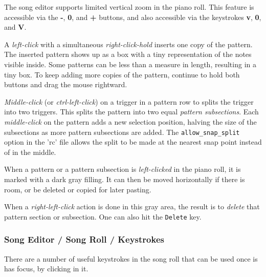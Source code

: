    The song editor supports limited vertical zoom in the piano roll.
   This feature is accessible via the \textbf{-}, \textbf{0}, and
   \textbf{+} buttons, and also
   accessible via the keystrokes \textbf{v}, \textbf{0}, and \textbf{V}.

   A \textsl{left-click} with a simultaneous
   \textsl{right-click-hold} inserts one copy of the
   pattern.  The inserted pattern shows up as a box with a tiny
   representation of the notes visible inside.  Some patterns can
   be less than a measure in length, resulting in a tiny box.
   To keep adding more copies of the pattern, continue to hold both buttons
   and drag the mouse rightward.

   \textsl{Middle-click} (or \textsl{ctrl-left-click})
   on a trigger in a pattern row
   to splits the trigger into two triggers.
   This splits the pattern into two equal \textsl{pattern subsections}.
   Each \textsl{middle-click} on the pattern adds a new selection position,
   halving the size of the subsections as more pattern subsections are
   added.  The \texttt{allow\_snap\_split} option in the 'rc' file
   allows the split to be made at the nearest snap point instead of in the
   middle.

   When a pattern or a pattern subsection is
   \textsl{left-clicked} in the piano
   roll, it is marked with a dark gray filling.
   It can then be moved horizontally if there is room, or be deleted or copied
   for later pasting.

   When a 
   \textsl{right-left-click} action is done in this gray area, the result
   is to \textsl{delete} that pattern section or subsection.
   One can also hit the \texttt{Delete} key.

\subsubsection{Song Editor / Song Roll / Keystrokes}
\label{subsubsec:song_editor_song_roll_keystrokes}

   There are a number of useful keystrokes in the song roll that can be used
   once is has focus, by clicking in it.

